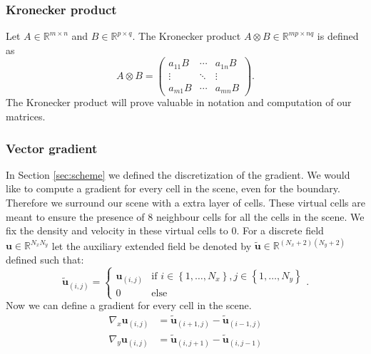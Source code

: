 \documentclass{article}
\let\oldtil\tilde
\renewcommand{\vec}[1]{\mathbf{#1}}
\renewcommand{\tilde}[1]{\oldtil{\mathbf{#1}}}
\begin{document}
\subsubsection{Kronecker product}
Let $A \in \mathbb{R}^{m\times n}$ and $B \in \mathbb{R}^{p \times q}$. The Kronecker product $A\otimes B\in \mathbb{R}^{mp \times nq}$ is defined as
\begin{equation*}
	A\otimes B = \begin{pmatrix}
		a_{11}B &\cdots & a_{1n}B\\
		\vdots & \ddots & \vdots\\
		a_{m1}B & \cdots & a_{mn}B
	\end{pmatrix}.
\end{equation*}
The Kronecker product will prove valuable in notation and computation of our matrices.
\subsubsection{Vector gradient}
In Section \ref{sec:scheme} we defined the discretization of the gradient. We would like to compute a gradient for every cell in the scene, even for the boundary. Therefore we surround our scene with a extra layer of cells. These virtual cells are meant to ensure the presence of 8 neighbour cells for all the cells in the scene. We fix the density and velocity in these virtual cells to 0. 
For a discrete field $\vec{u}\in \mathbb{R}^{N_xN_y}$ let the auxiliary extended field be denoted by $\vec{\tilde{u}} \in \mathbb{R}^{(N_x+2)(N_y+2)}$ defined such that:
\begin{equation}
	\vec{\tilde{u}}_{(i,j)} = \begin{cases}
		\vec{u}_{(i,j)}&\mbox{if } i \in \left\{ 1,\dots,N_x \right\},j \in \left\{ 1,\dots,N_y \right\} \\
		0&\mbox{else}
	\end{cases}.
	\label{def:gradient}
\end{equation}
Now we can define a gradient for every cell in the scene.
\begin{align*}
	\nabla_x\vec{u}_{(i,j)} &= \vec{\tilde{u}}_{(i+1,j)}-\vec{\tilde{u}}_{(i-1,j)}\\
	\nabla_y\vec{u}_{(i,j)} &= \vec{\tilde{u}}_{(i,j+1)}-\vec{\tilde{u}}_{(i,j-1)}
\end{align*}
\end{document}
